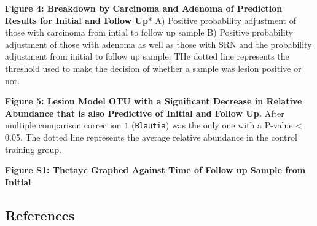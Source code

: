 \documentclass[12pt,]{article}
\begin{document}
\textbf{Figure 4: Breakdown by Carcinoma and Adenoma of Prediction
Results for Initial and Follow Up}* A) Positive probability adjustment
of those with carcinoma from intial to follow up sample B) Positive
probability adjustment of those with adenoma as well as those with SRN
and the probability adjustment from initial to follow up sample. THe
dotted line represents the threshold used to make the decision of
whether a sample was lesion positive or not.

\textbf{Figure 5: Lesion Model OTU with a Significant Decrease in
Relative Abundance that is also Predictive of Initial and Follow Up.}
After multiple comparison correction \texttt{1} (\texttt{Blautia}) was
the only one with a P-value \textless{} 0.05. The dotted line represents
the average relative abundance in the control training group.

\newpage

\textbf{Figure S1: Thetayc Graphed Against Time of Follow up Sample from
Initial}

\newpage

\subsection{References}\label{references}
\end{document}
